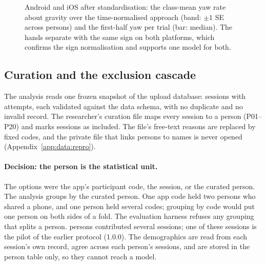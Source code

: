 \begin{figure}[htbp]
\centering
{}
\caption{Android and iOS after standardisation: the class-mean yaw rate about gravity over the time-normalised
approach (band: $\pm 1$ SE across persons) and the first-half yaw per trial (bar: median). The hands separate
with the same sign on both platforms, which confirms the sign normalisation and supports one model for both.}
\label{fig:S2_14_platforms}
\end{figure}


\subsection{Curation and the exclusion cascade}\label{app:data:curation}

The analysis reads one frozen snapshot of the upload database:  sessions with
 attempts, each validated against the data schema, with no duplicate and no invalid
record. The researcher's curation file maps every session to a person (P01--P20) and marks
 sessions as included. The file's free-text reasons are replaced by fixed codes,
and the private file that links persons to names is never opened (Appendix~\ref{app:data:repro}).

\paragraph{Decision: the person is the statistical unit.} The options were the app's participant code, the
session, or the curated person. The analysis groups by the curated person. One app code held two persons who
shared a phone, and one person held several codes; grouping by code would put one person on both sides of a
fold. The evaluation harness refuses any grouping that splits a person. 
persons contributed several sessions; one of these sessions is the pilot of the earlier protocol (1.0.0). The
demographics are read from each session's own record, agree across each person's sessions, and are stored in
the person table only, so they cannot reach a model.

